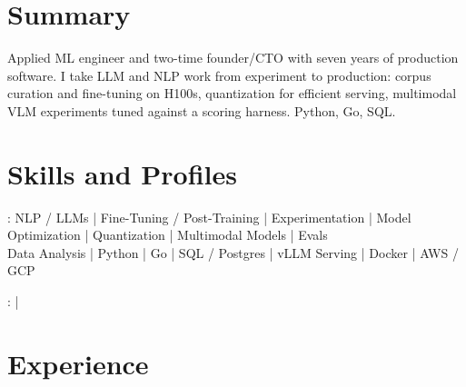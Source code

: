 \documentclass[print]{jack-resume}
\begin{document}
\pagecolor{darkmodeBackground}


\begin{minipage}[t][1cm][t]{.03\textwidth}
    \hfill
\end{minipage}

\section{Summary}
Applied ML engineer and two-time founder/CTO with seven years of production software. I take LLM and NLP work from experiment to production: corpus curation and fine-tuning on H100s, quantization for efficient serving, multimodal VLM experiments tuned against a scoring harness. Python, Go, SQL.
\sectionsep

\section{Skills and Profiles}
:
NLP / LLMs \hfill | \hfill
Fine-Tuning / Post-Training \hfill | \hfill
Experimentation \hfill | \hfill
Model Optimization \hfill | \hfill
Quantization \hfill | \hfill
Multimodal Models \hfill | \hfill
Evals \\
\hspace{1.0cm} Data Analysis \hfill | \hfill
Python \hfill | \hfill
Go \hfill | \hfill
SQL / Postgres \hfill | \hfill
vLLM Serving \hfill | \hfill
Docker \hfill | \hfill
AWS / GCP \\

\raggedright{
    :
      \href{https://www.linkedin.com/in/jack-sturtevant/}{ \ExternalLink} |
     \href{https://github.com/jacksturt}{ \ExternalLink}}

\section{Experience}
\end{document}
